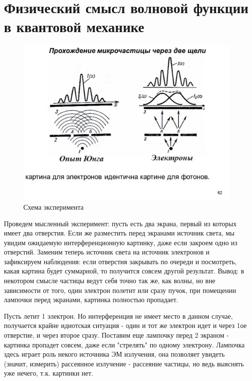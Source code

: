 \newpage
\chapter{Физический смысл волновой функции в квантовой механике}
 
\begin{figure} 
\vspace{-2ex}
\includegraphics[width=0.9\linewidth]{pictures/4.2.jpg}
\caption{Схема эксперимента}
\end{figure}
\par Проведем мысленный эксперимент: пусть есть два экрана, первый из которых имеет два отверстия. Если же разместить перед экранами источник света, мы увидим ожидаемую интерференционную картинку, даже если закроем одно из отверстий. Заменим теперь источник света на источник электронов и зафиксируем наблюдения: если отверстия закрывать по очереди и посмотреть, какая картина будет суммарной, то получится совсем другой результат. Вывод: в некотором смысле частицы ведут себя точно так же, как волны, но вне зависимости от того, один электрон полетит или сразу пучок, при помещении лампочки перед экранами, картинка полностью пропадает. 
\par Пусть летит 1 электрон. Но интерференция не имеет место в данном случае, получается крайне идиотская ситуация - один и тот же электрон идет и через 1ое отверстие, и через второе сразу. Поставим еще лампочку перед 2 экраном - картинка пропадет совсем, даже если "стрелять" по одному электрону. Лампочка здесь играет роль некого источника ЭМ излучения, она позволяет увидеть (значит, измерить) рассеянное излучение - рассеяние частицы, но ведь выяснять уже нечего, т.к. картинки нет.
